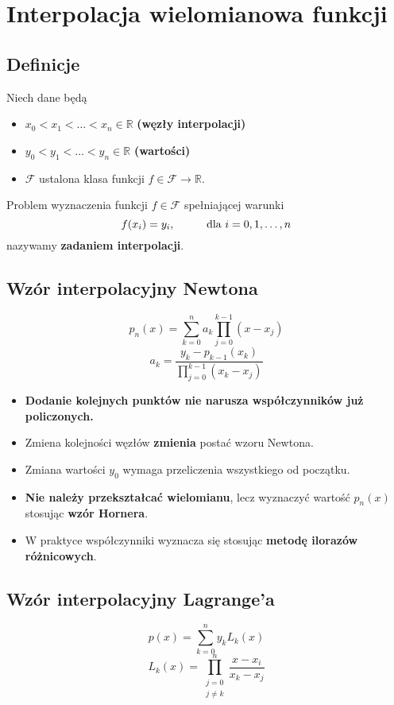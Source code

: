 \documentclass[../mn-notatki.tex]{subfiles}
\begin{document}
\section{Interpolacja wielomianowa funkcji}

\subsection{Definicje}
\begin{tcolorbox}
Niech dane będą
\begin{itemize}
    \item $x_0 < x_1 < \ldots < x_n \in \mathbb{R}$ \textbf{(węzły interpolacji)}
    \item $y_0 < y_1 < \ldots < y_n \in \mathbb{R}$ \textbf{(wartości)}
    \item $\mathcal{F}$ ustalona klasa funkcji $f \in \mathcal{F} \rightarrow
    \mathbb{R}$.
\end{itemize}
Problem wyznaczenia funkcji $f \in \mathcal{F}$ spełniającej warunki
\[
f(x_i) = y_i, \hspace*{1cm} \text{dla } i = 0, 1, \ldots, n
\]
nazywamy \textbf{zadaniem interpolacji}.
\end{tcolorbox}

\subsection{Wzór interpolacyjny Newtona}
\begin{tcolorbox}
\[
p_n(x) = \sum_{k=0}^{n} a_k \prod_{j=0}^{k-1} (x-x_j)
\]
\[
a_k = \frac{y_k - p_{k-1}(x_k)}{\prod_{j=0}^{k-1}(x_k - x_j)}
\]
\end{tcolorbox}

\begin{itemize}
    \item \textbf{Dodanie kolejnych punktów nie narusza współczynników już
    policzonych.}
    \item Zmiena kolejności węzłów \textbf{zmienia} postać wzoru Newtona.
    \item Zmiana wartości $y_0$ wymaga przeliczenia wszystkiego od początku.
    \item \textbf{Nie należy przekształcać wielomianu}, lecz wyznaczyć wartość
    $p_n(x)$ stosując \textbf{wzór Hornera}.
    \item W praktyce współczynniki wyznacza się stosując \textbf{metodę ilorazów
    różnicowych}.
\end{itemize}

\subsection{Wzór interpolacyjny Lagrange'a}
\begin{tcolorbox}
\[
p(x) = \sum_{k=0}^{n} y_k L_k(x)
\]
\[
L_k(x) = \prod_{\substack{j=0\\j\neq k}}^{n} \frac{x-x_i}{x_k-x_j}
\]
\end{tcolorbox}
\end{document}
